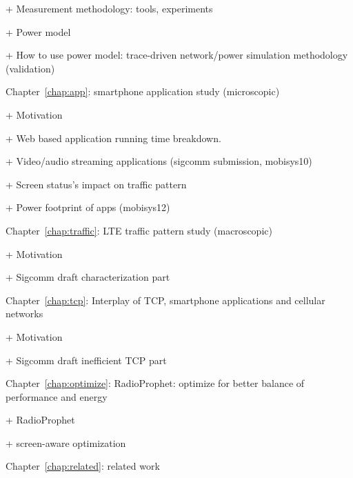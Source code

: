 	+ Measurement methodology: tools, experiments

	+ Power model

	+ How to use power model: trace-driven network/power simulation methodology (validation)
	
Chapter~\ref{chap:app}: smartphone application study (microscopic)

	+ Motivation

	+ Web based application running time breakdown.

	+ Video/audio streaming applications (sigcomm submission, mobisys10)

	+ Screen status's impact on traffic pattern

	+ Power footprint of apps (mobisys12)
	
Chapter~\ref{chap:traffic}: LTE traffic pattern study (macroscopic)

	+ Motivation

	+ Sigcomm draft characterization part

Chapter~\ref{chap:tcp}: Interplay of TCP, smartphone applications and cellular networks

	+ Motivation

	+ Sigcomm draft inefficient TCP part
		
Chapter~\ref{chap:optimize}: RadioProphet: optimize for better balance of performance and energy

	+ RadioProphet

	+ screen-aware optimization
	
Chapter~\ref{chap:related}: related work
